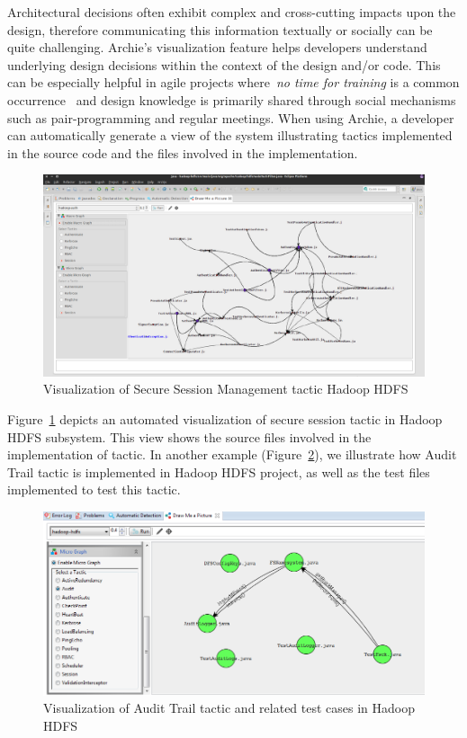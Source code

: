 Architectural decisions often exhibit complex and cross-cutting 
impacts upon the design, therefore communicating this information textually or socially can be quite challenging. Archie's visualization feature helps developers understand underlying design decisions within the context of the design and/or code. This can be especially helpful in agile projects where~\emph{no time for training} is a common occurrence~\cite{SEI_MaximumAwesome_url}  and design knowledge is primarily shared through social mechanisms such as pair-programming and regular meetings. When using Archie, a developer can automatically generate a view of the system illustrating tactics implemented in the source code and the files involved in the implementation.

\begin{figure}[tbph]
\centering
\includegraphics[width=0.9\linewidth]{./Visual1}
\caption{Visualization of Secure Session Management tactic Hadoop HDFS }
\label{fig:Visual1}
\end{figure}

Figure~\ref{fig:Visual1} depicts an automated visualization of secure session tactic in Hadoop HDFS subsystem. This view shows the source files involved in the implementation of tactic. In another example (Figure~\ref{fig:Audit}), we illustrate how Audit Trail tactic is implemented in Hadoop HDFS project, as well as the test files implemented to test this tactic. 

\begin{figure}[tbph]
\centering
\includegraphics[width=0.9\linewidth]{./Audit}
\caption{Visualization of Audit Trail tactic and related test cases in Hadoop HDFS}
\label{fig:Audit}
\end{figure}
 

